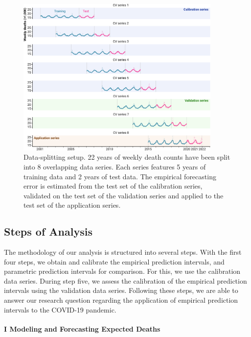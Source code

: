 \documentclass[12pt]{article}
\begin{document}
\begin{figure}[ht!]
    \centering
    \includegraphics[width=0.9\textwidth]{fig/20-cv.pdf}
     \caption{Data-splitting setup. 22 years of weekly death counts have been split into 8 overlapping data series. Each series features 5 years of training data and 2 years of test data. The empirical forecasting error is estimated from the test set of the calibration series, validated on the test set of the validation series and applied to the test set of the application series.}
     \label{fig:data_str}
\end{figure}

\subsection*{Steps of Analysis}
The methodology of our analysis is structured into several steps. With the first four steps, we obtain and calibrate the empirical prediction intervals, and parametric prediction intervals for comparison. For this, we use the calibration data series. During step five, we assess the calibration of the empirical prediction intervals using the validation data series. 
Following these steps, we are able to answer our research question regarding the application of empirical prediction intervals to the COVID-19 pandemic.

\paragraph{I Modeling and Forecasting Expected Deaths}
\end{document}
